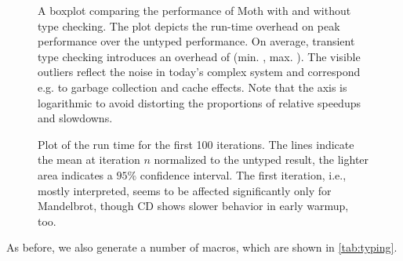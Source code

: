 \documentclass[a4paper,USenglish]{darts-v2019}
\newcommand{\ie}{i.e.\xspace}
\newcommand{\eg}{e.g.\xspace}
\begin{document}
\begin{figure}[htb]
  \centering
	\TypingOverhead{}
	\caption{A boxplot comparing the performance of Moth
  with and without type checking.
  The plot depicts the run-time overhead on peak performance over
  the untyped performance. On average, transient type checking introduces
  an overhead of \OverheadTypingGMeanP (min. \OverheadTypingMinP, max. \OverheadTypingMaxP).
  The visible outliers reflect the noise in today's complex system
  and correspond \eg to garbage collection and cache effects.
  Note that the axis is logarithmic to avoid distorting the proportions
  of relative speedups and slowdowns.}
	\label{fig:typing-overhead}
\end{figure}

\begin{figure}[htb]
  \centering
  \TypingWarmupConfInterval{}
	\caption{Plot of the run time for the first 100 iterations.
           The lines indicate the mean at iteration $n$ normalized
           to the untyped result, the lighter area indicates a $95\%$ confidence interval.
           The first iteration, \ie, mostly interpreted, seems
           to be affected significantly only for Mandelbrot, though
           CD shows slower behavior in early warmup, too.}
	\label{fig:typing-warmup}
\end{figure}

As before, we also generate a number of macros, which are shown in \cref{tab:typing}.
\end{document}
